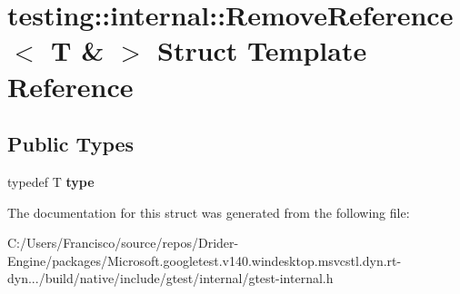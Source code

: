 \hypertarget{structtesting_1_1internal_1_1_remove_reference_3_01_t_01_6_01_4}{}\section{testing\+:\+:internal\+:\+:Remove\+Reference$<$ T \& $>$ Struct Template Reference}
\label{structtesting_1_1internal_1_1_remove_reference_3_01_t_01_6_01_4}
\subsection*{Public Types}
\begin{DoxyCompactItemize}
\item 
\mbox{\label{structtesting_1_1internal_1_1_remove_reference_3_01_t_01_6_01_4_a3d0f32a66759f333c2dd66aa31005e6d}} 
typedef T {\bfseries type}
\end{DoxyCompactItemize}


The documentation for this struct was generated from the following file\+:\begin{DoxyCompactItemize}
\item 
C\+:/\+Users/\+Francisco/source/repos/\+Drider-\/\+Engine/packages/\+Microsoft.\+googletest.\+v140.\+windesktop.\+msvcstl.\+dyn.\+rt-\/dyn.../build/native/include/gtest/internal/gtest-\/internal.\+h\end{DoxyCompactItemize}
